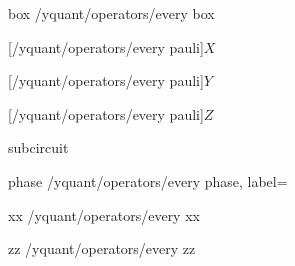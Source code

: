 \def\yquantdefinebox@#1#2{%
   \@ifnextchar[{\yquantdefinebox@i{#1}{#2}}%
                {\yquantdefinebox@i{#1}{#2}[/yquant/operators/every box]}%
}

\protected\long{}

\yquant@langhelper@declare@command%
   {box}%
   \yquant@register@get@allowmultitrue%
   {%
      \expandafter\yquant@prepare%
         \expandafter{\yquant@lang@attr@value}%
         {/yquant/operators/every box}%
   }


[/yquant/operators/every pauli]{$X$}

[/yquant/operators/every pauli]{$Y$}

[/yquant/operators/every pauli]{$Z$}

\yquant@langhelper@declare@command%
   {subcircuit}%
   \yquant@register@get@multiaslist%
   {%
   }

\yquant@langhelper@declare@command%
   {phase}%
   {}%
   {%
      \edef\cmd{%
         \yquant@prepare%
            {}%
            {/yquant/operators/every phase, label={\unexpanded\expandafter{\yquant@lang@attr@value}}}%
      }%
      \cmd%
   }
%

\yquant@langhelper@declare@command%
   {xx}%
   \yquant@register@get@multiassingle%
   {%
      \yquant@prepare%
         {}%
         {/yquant/operators/every xx}%
   }

\yquant@langhelper@declare@command@uncontrolled%
   {zz}%
   \yquant@register@get@multiassingle%
   {%
      \yquant@prepare%
         {}%
         {/yquant/operators/every zz}%
   }

